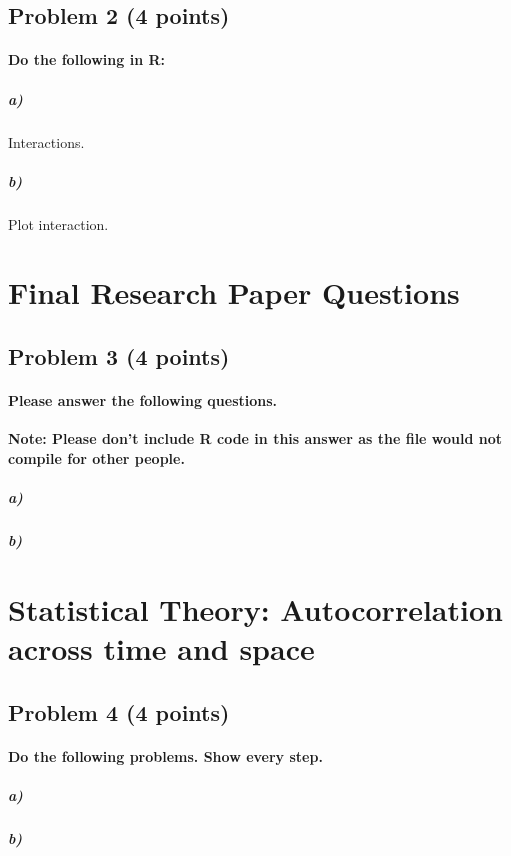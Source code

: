 \documentclass[12pt]{article}
\begin{document}
\subsection*{Problem 2 (4 points)}

\paragraph{Do the following in R:}

\subparagraph{a)} Interactions.

\subparagraph{b)} Plot interaction.



\section*{Final Research Paper Questions}

\subsection*{Problem 3 (4 points)}

\paragraph{Please answer the following questions.}

\textbf{Note: Please don't include R code in this answer as the file would not compile for other people.} 

\subparagraph{a)} 

\subparagraph{b)} 



\section*{Statistical Theory: Autocorrelation across time and space}

\subsection*{Problem 4 (4 points)}

\paragraph{Do the following problems. Show every step.}

\subparagraph{a)}

\subparagraph{b)}
\end{document}
